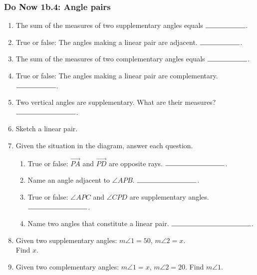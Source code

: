 \documentclass[12pt, oneside]{article}
\begin{document}
\subsubsection*{Do Now 1b.4: Angle pairs} %
  \vspace{0.5cm}
  \begin{enumerate}

    \item The sum of the measures of two supplementary angles equals $\rule{2cm}{0.15mm}$. \bigskip
    \item True or false: The angles making a linear pair are adjacent. $\rule{2cm}{0.15mm}$. \bigskip
    \item The sum of the measures of two complementary angles equals $\rule{2cm}{0.15mm}$. \bigskip
    \item True or false: The angles making a linear pair are complementary. $\rule{2cm}{0.15mm}$. \bigskip
    \item Two vertical angles are supplementary. What are their measures? $\rule{3cm}{0.15mm}$. \bigskip
    \item Sketch a linear pair. \vspace{3cm}

      \item Given the situation in the diagram, answer each question. \vspace{1cm}
        \begin{flushright}
        \end{flushright}
      \begin{enumerate}
        \item True or false: $\overrightarrow{PA}$ and $\overrightarrow{PD}$ are opposite rays. $\rule{3cm}{0.15mm}$. \bigskip
        \item Name an angle adjacent to $\angle APB$. $\rule{3cm}{0.15mm}$. \bigskip
        \item True or false: $\angle APC$ and $\angle CPD$ are supplementary angles. $\rule{3cm}{0.15mm}$. \bigskip
        \item Name two angles that constitute a linear pair. $\rule{4cm}{0.15mm}$. \bigskip
      \end{enumerate}
  \newpage
      \item Given two supplementary angles: $m \angle 1 = 50$, $m \angle 2 = x$.\\ Find $x$. \vspace{2cm}
      \item Given two complementary angles: $m \angle 1 = x$, $m \angle 2 = 20$. Find $m \angle 1$. \vspace{2cm}


\end{enumerate}
\end{document}
